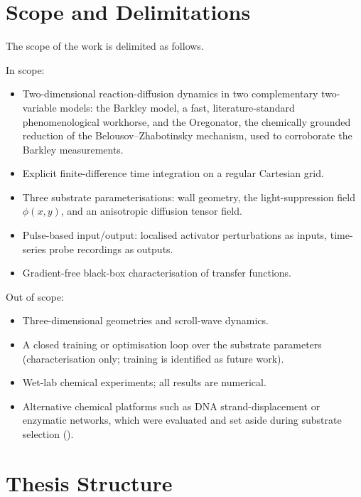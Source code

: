 \section{Scope and Delimitations}
\label{sec:scope}

The scope of the work is delimited as follows.

In scope:
\begin{itemize}
    \item Two-dimensional reaction-diffusion dynamics in two complementary two-variable models: the Barkley model, a fast, literature-standard phenomenological workhorse, and the Oregonator, the chemically grounded reduction of the Belousov--Zhabotinsky mechanism, used to corroborate the Barkley measurements.
    \item Explicit finite-difference time integration on a regular Cartesian grid.
    \item Three substrate parameterisations: wall geometry, the light-suppression field $\phi(x,y)$, and an anisotropic diffusion tensor field.
    \item Pulse-based input/output: localised activator perturbations as inputs, time-series probe recordings as outputs.
    \item Gradient-free black-box characterisation of transfer functions.
\end{itemize}

Out of scope:
\begin{itemize}
    \item Three-dimensional geometries and scroll-wave dynamics.
    \item A closed training or optimisation loop over the substrate parameters (characterisation only; training is identified as future work).
    \item Wet-lab chemical experiments; all results are numerical.
    \item Alternative chemical platforms such as DNA strand-displacement or enzymatic networks, which were evaluated and set aside during substrate selection ().
\end{itemize}

\section{Thesis Structure}
\label{sec:structure}

